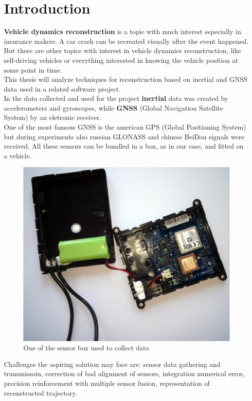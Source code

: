 \chapter{Introduction}
\label{chap:intro}

\textbf{Vehicle dynamics reconstruction} is a topic with much interest especially in insurance makers. A car crash can be recreated visually after the event happened. But there are other topics with interest in vehicle dynamics reconstruction, like self-driving vehicles or everything interested in knowing the vehicle position at some point in time. \\
This thesis will analyze techniques for reconstruction based on inertial and GNSS data used in a related software project. \\
In the data collected and used for the project \textbf{inertial} data was created by accelerometers and gyroscopes, while \textbf{GNSS} (Global Navigation Satellite System) by an eletronic receiver. \\ One of the most famous GNSS is the american GPS (Global Positioning System) but during experiments also russian GLONASS and chinese BeiDou signals were received.
All these sensors can be bundled in a box, as in our case, and fitted on a vehicle. \\

\begin{figure}[H]
\includegraphics[width=\textwidth]{box.jpg}
\caption{One of the sensor box used to collect data}
\end{figure}

Challenges the aspiring solution may face are: sensor data gathering and transmissoin, correction of bad alignment of sensors, integration numerical error, precision reinforcement with multiple sensor fusion, representation of reconstructed trajectory.

